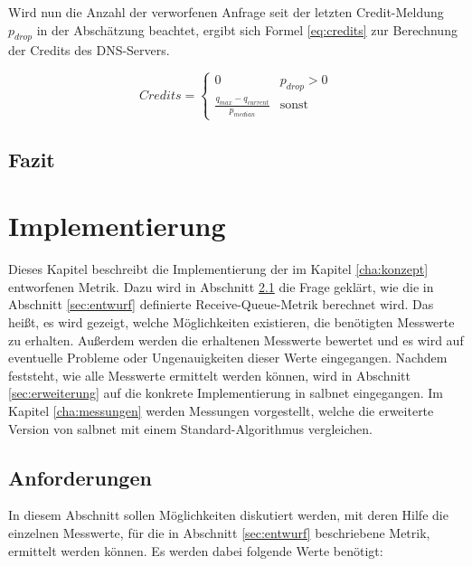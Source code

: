 \documentclass[a4paper, 12pt, BCOR10mm, DIV12, toc=bibliography, toc=listof, german]{scrbook}
\begin{document}
		Wird nun die Anzahl der verworfenen Anfrage seit der letzten Credit-Meldung $p_{drop}$
		in der Abschätzung beachtet, ergibt sich Formel \ref{eq:credits} zur Berechnung der Credits des
		DNS-Servers.

		\begin{equation}
			Credits = \begin{cases}0 & p_{drop}>0\\ \frac{\displaystyle q_{max} - q_{current}}{\displaystyle p_{median}}
			  & \text{sonst}\end{cases}
			\label{eq:credits}
		\end{equation}



		\section{Fazit} %
		\label{sec:konzept-fazit}
		


	\chapter{Implementierung} %
	\label{cha:implementierung}

	Dieses Kapitel beschreibt die Implementierung der im Kapitel \ref{cha:konzept} entworfenen Metrik.
	Dazu wird in Abschnitt \ref{sec:anforderungen} die Frage geklärt, wie die in Abschnitt
	\ref{sec:entwurf} definierte Receive-Queue-Metrik berechnet wird. Das heißt, es wird gezeigt, welche
	Möglichkeiten existieren, die benötigten Messwerte zu erhalten. Außerdem werden die erhaltenen
	Messwerte bewertet und es wird auf eventuelle Probleme oder Ungenauigkeiten dieser Werte
	eingegangen. Nachdem feststeht, wie alle Messwerte ermittelt werden können, wird in Abschnitt
	\ref{sec:erweiterung} auf die konkrete Implementierung in salbnet eingegangen. Im Kapitel
	\ref{cha:messungen} werden Messungen vorgestellt, welche die erweiterte Version von salbnet mit
	einem Standard-Algorithmus vergleichen.

		\section{Anforderungen} %
		\label{sec:anforderungen}

		In diesem Abschnitt sollen Möglichkeiten diskutiert werden, mit deren Hilfe die einzelnen
		Messwerte, für die in Abschnitt \ref{sec:entwurf} beschriebene Metrik, ermittelt werden können. Es
		werden dabei folgende Werte benötigt: $~$\\
		
\end{document}
